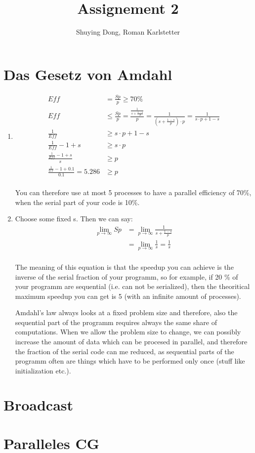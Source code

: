 \documentclass[a4paper,10pt]{article}
\title{Assignement 2}
\author{Shuying Dong, Roman Karlstetter}
\begin{document}
\section{Das Gesetz von Amdahl}
\renewcommand{\labelenumi}{\alph{enumi})}
\begin{enumerate}
 \item 
\begin{align*}
Eff &= \frac{Sp}{p} \geq 70 \% \\
Eff &\leq  \frac{Sp}{p} = \frac{\frac{1}{s+{\frac{1-s}{p}}}}{p} = \frac{1}{(s+{\frac{1-s}{p}}) \cdot p}  = \frac{1}{s\cdot p+1-s}\\
\frac{1}{Eff} &\geq  s\cdot p+1-s\\
\frac{1}{Eff} -1 + s &\geq  s\cdot p\\
\frac{\frac{1}{Eff} -1 + s}{s} &\geq  p\\
\frac{\frac{1}{0.7} -1 + 0.1}{0.1} = 5.286 &\geq  p\\
\end{align*}

You can therefore use at most 5 processes to have a parallel efficiency of 70\%, when the serial part of your code is 10\%.
\item 
Choose some fixed s. Then we can say: 
\begin{align*}
 \lim\limits_{p \rightarrow \infty}{Sp} &= \lim\limits_{p \rightarrow \infty}{\frac{1}{s+{\frac{1-s}{p}}}}\\
&= \lim\limits_{p \rightarrow \infty}{\frac{1}{s}} = \frac{1}{s}\\
\end{align*}

The meaning of this equation is that the speedup you can achieve is the inverse of the serial fraction of your programm, so for example, if 20 \% of your programm are sequential (i.e. can not be serialized), then the theoritical maximum speedup you can get is 5 (with an infinite amount of processes).

Amdahl's law always looks at a fixed problem size and therefore, also the sequential part of the programm requires always the same share of computations. When we allow the problem size to change, we can possibly increase the amount of data which can be procesed in parallel, and therefore the fraction of the serial code can me reduced, as sequential parts of the programm often are things which have to be performed only once (stuff like initialization etc.). 

\end{enumerate}

\section{Broadcast}

\section{Paralleles CG}
\end{document}
